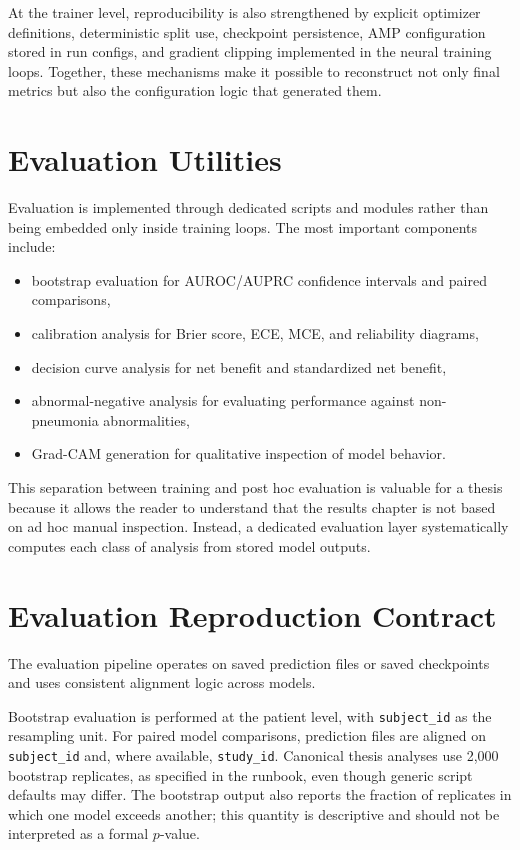 At the trainer level, reproducibility is also strengthened by explicit optimizer definitions, deterministic split use, checkpoint persistence, AMP configuration stored in run configs, and gradient clipping implemented in the neural training loops. Together, these mechanisms make it possible to reconstruct not only final metrics but also the configuration logic that generated them.

\section{Evaluation Utilities}

Evaluation is implemented through dedicated scripts and modules rather than being embedded only inside training loops. The most important components include:

\begin{itemize}
    \item bootstrap evaluation for AUROC/AUPRC confidence intervals and paired comparisons,
    \item calibration analysis for Brier score, ECE, MCE, and reliability diagrams,
    \item decision curve analysis for net benefit and standardized net benefit,
    \item abnormal-negative analysis for evaluating performance against non-pneumonia abnormalities,
    \item Grad-CAM generation for qualitative inspection of model behavior.
\end{itemize}

This separation between training and post hoc evaluation is valuable for a thesis because it allows the reader to understand that the results chapter is not based on ad hoc manual inspection. Instead, a dedicated evaluation layer systematically computes each class of analysis from stored model outputs.

\section{Evaluation Reproduction Contract}

The evaluation pipeline operates on saved prediction files or saved checkpoints and uses consistent alignment logic across models.

Bootstrap evaluation is performed at the patient level, with \texttt{subject\_id} as the resampling unit. For paired model comparisons, prediction files are aligned on \texttt{subject\_id} and, where available, \texttt{study\_id}. Canonical thesis analyses use 2{,}000 bootstrap replicates, as specified in the runbook, even though generic script defaults may differ. The bootstrap output also reports the fraction of replicates in which one model exceeds another; this quantity is descriptive and should not be interpreted as a formal \(p\)-value.


